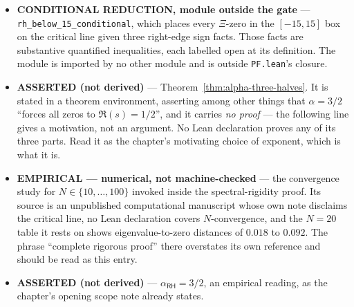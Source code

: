 \begin{itemize}
\emph{And the two do not combine into new information.}
\texttt{hp\_positive\_iff\_countable\_nonempty} shows
\texttt{PF\_T3SymIsHilbertPolyaOperator\_Positive} is equivalent to
countability together with nonemptiness, and
\texttt{positive\_on\_line\_zeta\_zero\_ordinates\_countable\_discharged}
discharges countability \emph{unconditionally}. So the operator premise follows
from the first premise alone, and the second premise is therefore logically
equivalent to the Riemann Hypothesis itself. The corpus records this in its own
words: \texttt{HilbertPolyaIdentificationPrecise.lean} states that discharging
\texttt{PF\_T3SymIsHilbertPolyaOperator} is logically equivalent to
discharging RH. The discharge is honest, and it transports nothing.

\item \textbf{CONDITIONAL REDUCTION, module outside the gate} ---
\texttt{rh\_below\_15\_conditional}, which places every $\Xi$-zero in the
$[-15,15]$ box on the critical line given three right-edge sign facts. Those
facts are substantive quantified inequalities, each labelled open at its
definition. The module is imported by no other module and is outside
\texttt{PF.lean}'s closure.

\item \textbf{ASSERTED (not derived)} --- Theorem~\ref{thm:alpha-three-halves}.
It is stated in a theorem environment, asserting among other things that
$\alpha = 3/2$ ``forces all zeros to $\Re(s) = 1/2$'', and it carries
\emph{no proof} --- the following line gives a motivation, not an argument. No
Lean declaration proves any of its three parts. Read it as the chapter's
motivating choice of exponent, which is what it is.

\item \textbf{EMPIRICAL --- numerical, not machine-checked} --- the
convergence study for $N \in \{10,\dots,100\}$ invoked inside the
spectral-rigidity proof. Its source is an unpublished computational manuscript
whose own note disclaims the critical line, no Lean declaration covers
$N$-convergence, and the $N = 20$ table it rests on shows eigenvalue-to-zero
distances of $0.018$ to $0.092$. The phrase ``complete rigorous proof'' there
overstates its own reference and should be read as this entry.

\item \textbf{ASSERTED (not derived)} --- $\alpha_{\textsf{RH}} = 3/2$, an
empirical reading, as the chapter's opening scope note already states.

\end{itemize}

